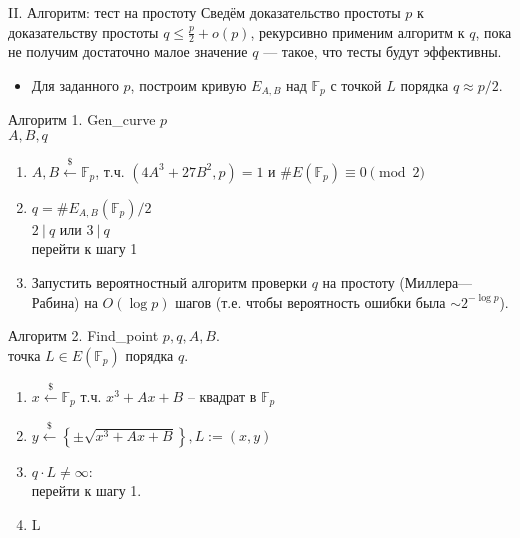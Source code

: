 \documentclass{beamer}
\begin{document}
\begin{frame}{II. Алгоритм: тест на простоту}
     Сведём доказательство простоты $p$ к доказательству простоты $q \leq \frac{p}{2} + o(p)$, рекурсивно применим алгоритм к $q$, пока не получим достаточно малое значение $q$ — такое, что  тесты будут эффективны.
    \begin{itemize}
        \item Для заданного $p$, построим кривую $E_{A,B}$ над $\mathbb{F}_p$ с точкой $L$ порядка $q \approx p/2$.
    \end{itemize}
\end{frame}

\begin{frame}{Алгоритм 1. Gen\_curve}
     $p$\\
     $A,B,q$
    \begin{enumerate}
        \item $A, B \xleftarrow{\$} \mathbb{F}_p$, т.ч. $(4A^3 + 27B^2, p) = 1$ и $\#E(\mathbb{F}_p) \equiv 0 \pmod{2}$
        \item $q = \#E_{A,B}(\mathbb{F}_p) / 2$\\
         {$2\ |\ q$ или $3\ |\ q$}\\
        \quad перейти к шагу 1  
        \item Запустить вероятностный алгоритм проверки $q$ на простоту (Миллера—Рабина) на $O(\log p)$ шагов (т.е. чтобы вероятность ошибки была $\sim 2^{-\log p}$).
    \end{enumerate}
\end{frame}

\begin{frame}{Алгоритм 2. Find\_point}
     $p, q, A, B$.\\
     точка $L \in E(\mathbb{F}_p)$ порядка $q$.
    \begin{enumerate}
        \item $x \xleftarrow{\$} \mathbb{F}_p$ т.ч. $x^3+Ax+B$ -- квадрат в $\mathbb{F}_p$
        \item $y \xleftarrow{\$} \left\{ \pm \sqrt{x^3 + Ax+B} \right\}, L:=(x,y)$
        \item {} {$q \cdot L \neq \infty$}:\\
        \quad перейти к шагу 1.
        \item {} L
    \end{enumerate}
\end{frame}
\end{document}
